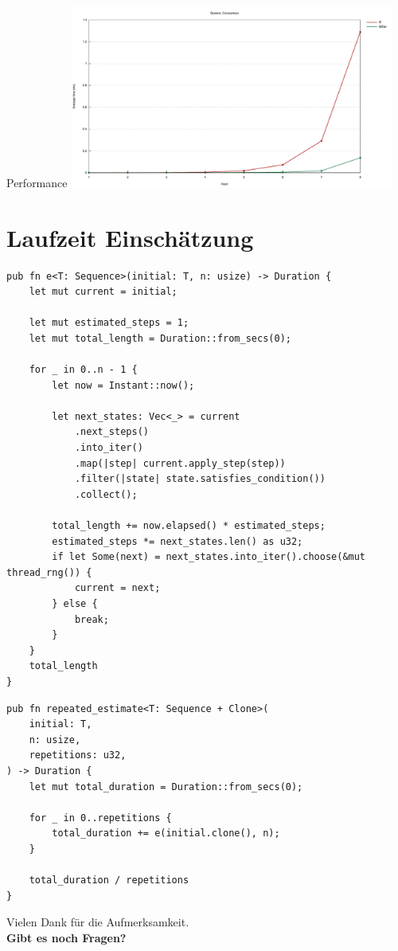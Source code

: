 \documentclass[aspectratio=43,t]{beamer}
\begin{document}

\begin{frame}[fragile]{Performance}
  \includegraphics[width=0.8\textwidth, clip]{../img/langford_lines.pdf}
\end{frame}
\section{Laufzeit Einschätzung}
\begin{frame}[fragile]
  \begin{verbatim}
pub fn e<T: Sequence>(initial: T, n: usize) -> Duration {
    let mut current = initial;

    let mut estimated_steps = 1;
    let mut total_length = Duration::from_secs(0);

    for _ in 0..n - 1 {
        let now = Instant::now();

        let next_states: Vec<_> = current
            .next_steps()
            .into_iter()
            .map(|step| current.apply_step(step))
            .filter(|state| state.satisfies_condition())
            .collect();

        total_length += now.elapsed() * estimated_steps;
        estimated_steps *= next_states.len() as u32;
        if let Some(next) = next_states.into_iter().choose(&mut thread_rng()) {
            current = next;
        } else {
            break;
        }
    }
    total_length
}
  \end{verbatim}
\end{frame}
\begin{frame}[fragile]
  \begin{verbatim}
pub fn repeated_estimate<T: Sequence + Clone>(
    initial: T,
    n: usize,
    repetitions: u32,
) -> Duration {
    let mut total_duration = Duration::from_secs(0);

    for _ in 0..repetitions {
        total_duration += e(initial.clone(), n);
    }

    total_duration / repetitions
}
  \end{verbatim}
\end{frame}

  { %
    \begin{frame}[c,noframenumbering]
      \begin{center}
        Vielen Dank für die Aufmerksamkeit.\\
        {\bf Gibt es noch Fragen?}
      \end{center}
    \end{frame}
  }
\end{document}
